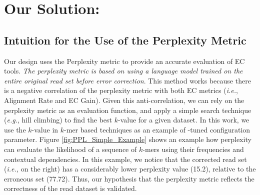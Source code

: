 \section{Our Solution: {\bf \name}}
\subsection{Intuition for the Use of the Perplexity Metric}
Our design uses the Perplexity metric to provide an accurate evaluation of EC tools. %
\textit{The perplexity metric is based on using a language model trained on the entire original read set before error correction}. 
This method works because there is a negative correlation of the perplexity metric with both EC metrics (\textit{i.e.}, Alignment Rate and EC Gain).
Given this anti-correlation, we can rely on the perplexity metric as an evaluation function, and apply a simple search technique (\textit{e.g.}, hill climbing) to find the best $k$-value for a given dataset. In this work, we use the $k$-value in $k$-mer based techniques as an example of \name-tuned configuration parameter. %
Figure \ref{fig:PPL_Simple_Example} shows an example how perplexity can evaluate the likelihood of a sequence of $k$-mers using their frequencies and contextual dependencies. In this example, we notice that the corrected read set (\textit{i.e.,} on the right) has a considerably lower perplexity value (15.2), relative to the erroneous set (77.72). Thus, our hypothesis that the perplexity metric reflects the correctness of the read dataset is validated.

